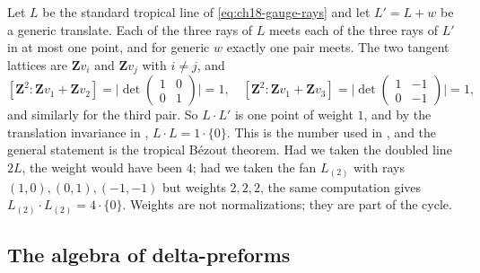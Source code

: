 \begin{example}
\label{ex:ch18-two-lines-numbers}
Let $L$ be the standard tropical line of \eqref{eq:ch18-gauge-rays} and let
$L'=L+w$ be a generic translate.  Each of the three rays of $L$ meets each
of the three rays of $L'$ in at most one point, and for generic $w$ exactly
one pair meets.  The two tangent lattices are $\mathbf Zv_i$ and
$\mathbf Zv_j$ with $i\neq j$, and
\[
 [\mathbf Z^2:\mathbf Zv_1+\mathbf Zv_2]
 =\bigl|\det\begin{pmatrix}1&0\\0&1\end{pmatrix}\bigr|=1,
 \quad
 [\mathbf Z^2:\mathbf Zv_1+\mathbf Zv_3]
 =\bigl|\det\begin{pmatrix}1&-1\\0&-1\end{pmatrix}\bigr|=1,
\]
and similarly for the third pair.  So $L\cdot L'$ is one point of weight
$1$, and by the translation invariance in
, $L\cdot L=1\cdot\{0\}$.  This is
the number used in , and the general statement is
the tropical B\'ezout theorem.  Had we taken the doubled line $2L$, the
weight would have been $4$; had we taken the fan
$L_{(2)}$ with rays $(1,0),(0,1),(-1,-1)$ but weights $2,2,2$, the same
computation gives $L_{(2)}\cdot L_{(2)}=4\cdot\{0\}$.  Weights are not
normalizations; they are part of the cycle.
\end{example}

\subsection{The algebra of delta-preforms}
\label{sec:ch18-delta-algebra}

